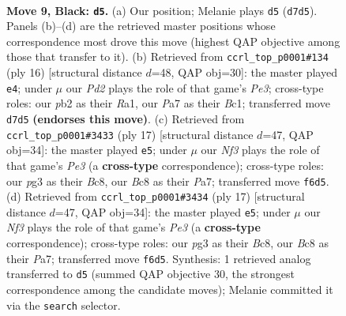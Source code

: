 \documentclass[11pt]{article}
\begin{document}
\clearpage

\begin{figure}[p]\centering
\begin{subfigure}{0.46\textwidth}\centering
\resizebox{\linewidth}{!}{%
\newchessgame
\chessboard[
  setfen={r1b1r1k1/ppppqppp/2n1pn2/8/2PP3P/2B1PNP1/PP3P2/R2QKB1R b KQ - 0 9},
  showmover=false,
  pgfstyle=straightmove, color=movearrow, markmove={d7-d5}
]}
\caption{}
\end{subfigure}\hfill
\begin{subfigure}{0.46\textwidth}\centering
\resizebox{\linewidth}{!}{%
\newchessgame
\chessboard[
  setfen={r1b1k2r/pp2bppp/2q1pn2/2pp4/8/2NPPN2/PPP2PPP/R1BQR1K1 w kq - 1 9},
  showmover=false,
  pgfstyle=straightmove, color=movearrow, markmove={e3-e4}
]}
\caption{}
\end{subfigure}
\\[4pt]
\begin{subfigure}{0.46\textwidth}\centering
\resizebox{\linewidth}{!}{%
\newchessgame
\chessboard[
  setfen={r1b2rk1/ppp1qppp/2nppn2/8/2PP4/P1BBPN2/1P3PPP/R2QK2R b KQ - 2 9},
  showmover=false,
  pgfstyle=straightmove, color=movearrow, markmove={e6-e5}
]}
\caption{}
\end{subfigure}\hfill
\begin{subfigure}{0.46\textwidth}\centering
\resizebox{\linewidth}{!}{%
\newchessgame
\chessboard[
  setfen={r1b2rk1/ppp1qppp/2nppn2/8/2PP4/P1BBPN2/1P3PPP/R2QK2R b KQ - 2 9},
  showmover=false,
  pgfstyle=straightmove, color=movearrow, markmove={e6-e5}
]}
\caption{}
\end{subfigure}
\caption{\textbf{Move 9, Black: \texttt{d5}.} (a) Our position; Melanie plays \texttt{d5} (\texttt{d7d5}). Panels (b)--(d) are the retrieved master positions whose correspondence most drove this move (highest QAP objective among those that transfer to it). (b) Retrieved from \texttt{ccrl\_top\_p0001\#134} (ply 16) [structural distance $d$=48, QAP obj=30]: the master played \texttt{e4}; under $\mu$ our \emph{Pd2} plays the role of that game's \emph{Pe3}; cross-type roles: our \emph{p}b2 as their \emph{R}a1, our \emph{P}a7 as their \emph{B}c1; transferred move \texttt{d7d5} \textbf{(endorses this move)}. (c) Retrieved from \texttt{ccrl\_top\_p0001\#3433} (ply 17) [structural distance $d$=47, QAP obj=34]: the master played \texttt{e5}; under $\mu$ our \emph{Nf3} plays the role of that game's \emph{Pe3} (a \textbf{cross-type} correspondence); cross-type roles: our \emph{p}g3 as their \emph{B}c8, our \emph{B}c8 as their \emph{P}a7; transferred move \texttt{f6d5}. (d) Retrieved from \texttt{ccrl\_top\_p0001\#3434} (ply 17) [structural distance $d$=47, QAP obj=34]: the master played \texttt{e5}; under $\mu$ our \emph{Nf3} plays the role of that game's \emph{Pe3} (a \textbf{cross-type} correspondence); cross-type roles: our \emph{p}g3 as their \emph{B}c8, our \emph{B}c8 as their \emph{P}a7; transferred move \texttt{f6d5}. Synthesis: 1 retrieved analog transferred to \texttt{d5} (summed QAP objective 30, the strongest correspondence among the candidate moves); Melanie committed it via the \texttt{search} selector.}
\label{fig:thought-m17}
\end{figure}
\end{document}
